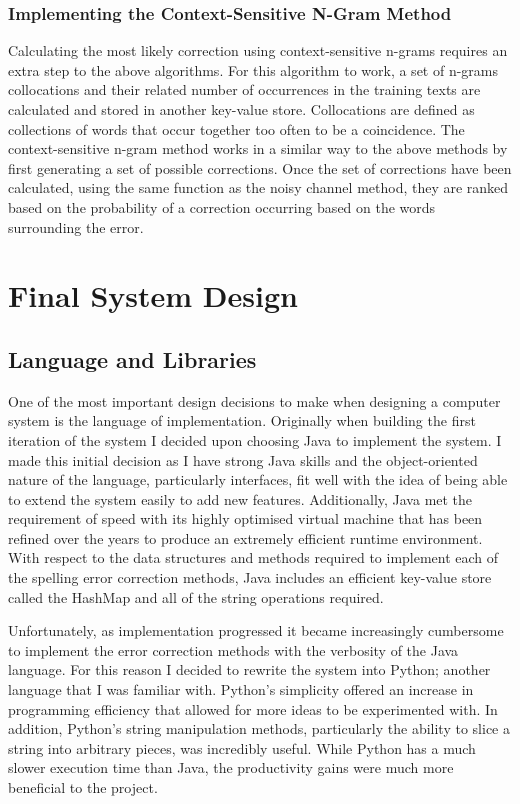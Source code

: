 \subsubsection{Implementing the Context-Sensitive N-Gram Method}
Calculating the most likely correction using context-sensitive n-grams requires an extra step to the above algorithms. For this algorithm to work, a set of n-grams collocations and their related number of occurrences in the training texts are calculated and stored in another key-value store. Collocations are defined as collections of words that occur together too often to be a coincidence. The context-sensitive n-gram method works in a similar way to the above methods by first generating a set of possible corrections. Once the set of corrections have been calculated, using the same function as the noisy channel method, they are ranked based on the probability of a correction occurring based on the words surrounding the error.

\section{Final System Design}

\subsection{Language and Libraries}
One of the most important design decisions to make when designing a computer system is the language of implementation. Originally when building the first iteration of the system I decided upon choosing Java to implement the system. I made this initial decision as I have strong Java skills and the object-oriented nature of the language, particularly interfaces, fit well with the idea of being able to extend the system easily to add new features. Additionally, Java met the requirement of speed with its highly optimised virtual machine that has been refined over the years to produce an extremely efficient runtime environment. With respect to the data structures and methods required to implement each of the spelling error correction methods, Java includes an efficient key-value store called the HashMap and all of the string operations required.

Unfortunately, as implementation progressed it became increasingly cumbersome to implement the error correction methods with the verbosity of the Java language. For this reason I decided to rewrite the system into Python; another language that I was familiar with. Python's simplicity offered an increase in programming efficiency that allowed for more ideas to be experimented with. In addition, Python's string manipulation methods, particularly the ability to slice a string into arbitrary pieces, was incredibly useful. While Python has a much slower execution time than Java, the productivity gains were much more beneficial to the project.

